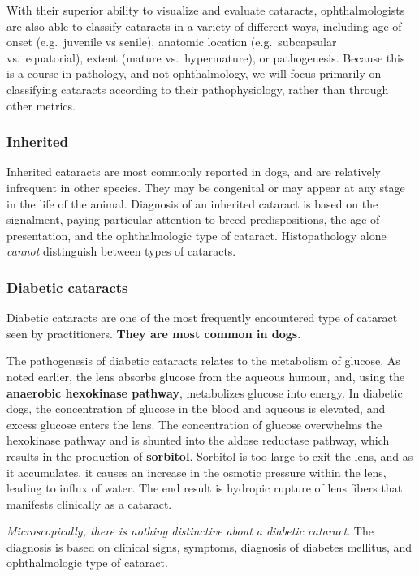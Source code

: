 \documentclass[openany]{article}
\begin{document}
With their superior ability to visualize and evaluate cataracts,
ophthalmologists are also able to classify cataracts in a variety of
different ways, including age of onset (e.g.~juvenile vs senile),
anatomic location (e.g.~subcapsular vs.~equatorial), extent (mature
vs.~hypermature), or pathogenesis. Because this is a course in
pathology, and not ophthalmology, we will focus primarily on classifying
cataracts according to their pathophysiology, rather than through other
metrics.

\subsubsection{Inherited}\label{inherited}

Inherited cataracts are most commonly reported in dogs, and are
relatively infrequent in other species. They may be congenital or may
appear at any stage in the life of the animal. Diagnosis of an inherited
cataract is based on the signalment, paying particular attention to
breed predispositions, the age of presentation, and the ophthalmologic
type of cataract. Histopathology alone \emph{cannot} distinguish between
types of cataracts.

\subsubsection{Diabetic cataracts}\label{diabetic-cataracts}

Diabetic cataracts are one of the most frequently encountered type of
cataract seen by practitioners. \textbf{They are most common in dogs}.

The pathogenesis of diabetic cataracts relates to the metabolism of
glucose. As noted earlier, the lens absorbs glucose from the aqueous
humour, and, using the \textbf{anaerobic hexokinase pathway},
metabolizes glucose into energy. In diabetic dogs, the concentration of
glucose in the blood and aqueous is elevated, and excess glucose enters
the lens. The concentration of glucose overwhelms the hexokinase pathway
and is shunted into the aldose reductase pathway, which results in the
production of \textbf{sorbitol}. Sorbitol is too large to exit the lens,
and as it accumulates, it causes an increase in the osmotic pressure
within the lens, leading to influx of water. The end result is hydropic
rupture of lens fibers that manifests clinically as a cataract.

\emph{Microscopically, there is nothing distinctive about a diabetic
cataract}. The diagnosis is based on clinical signs, symptoms, diagnosis
of diabetes mellitus, and ophthalmologic type of cataract.
\end{document}
